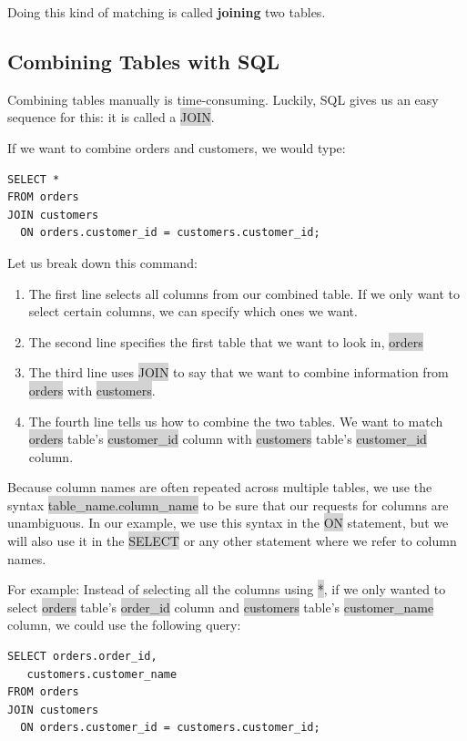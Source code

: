 \documentclass[11pt]{article}
\begin{document}
{{Doing this kind of matching is called \textbf{joining} two tables.

\subsection{Combining Tables with SQL}
Combining tables manually is time-consuming. Luckily, SQL gives us an easy sequence for this: it is called a \colorbox{lightgray}{JOIN}.

If we want to combine orders and customers, we would type:
\begin{lstlisting}
SELECT *
FROM orders
JOIN customers
  ON orders.customer_id = customers.customer_id;
\end{lstlisting}
Let us break down this command:
\begin{enumerate}[leftmargin = *]
\item The first line selects all columns from our combined table. If we only want to select certain columns, we can specify which ones we want.
\item The second line specifies the first table that we want to look in, \colorbox{lightgray}{orders}
\item The third line uses \colorbox{lightgray}{JOIN} to say that we want to combine information from \colorbox{lightgray}{orders} with \colorbox{lightgray}{customers}.
\item The fourth line tells us how to combine the two tables. We want to match \colorbox{lightgray}{orders} table’s \colorbox{lightgray}{customer\_id} column with \colorbox{lightgray}{customers} table’s \colorbox{lightgray}{customer\_id} column.
\end{enumerate}
Because column names are often repeated across multiple tables, we use the syntax \colorbox{lightgray}{table\_name.column\_name} to be sure that our requests for columns are unambiguous. In our example, we use this syntax in the \colorbox{lightgray}{ON} statement, but we will also use it in the \colorbox{lightgray}{SELECT} or any other statement where we refer to column names.

For example: Instead of selecting all the columns using \colorbox{lightgray}{*}, if we only wanted to select \colorbox{lightgray}{orders} table’s \colorbox{lightgray}{order\_id} column and \colorbox{lightgray}{customers} table’s \colorbox{lightgray}{customer\_name} column, we could use the following query:
\begin{lstlisting}
SELECT orders.order_id,
   customers.customer_name
FROM orders
JOIN customers
  ON orders.customer_id = customers.customer_id;
\end{lstlisting}

}}
\end{document}

